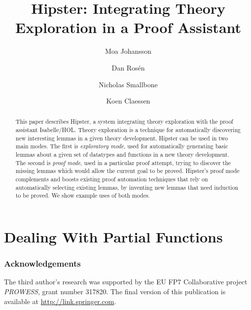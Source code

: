 \documentclass{llncs}
\begin{document}
\title{Hipster: Integrating Theory Exploration in a Proof Assistant}

\author{Moa Johansson \and Dan Ros\'en \and Nicholas Smallbone \and Koen Claessen}


\maketitle

\begin{abstract}

This paper describes Hipster, a system integrating theory exploration with the proof assistant Isabelle/HOL. Theory exploration is a technique for automatically discovering new interesting lemmas in a given theory development.
Hipster can be used in two main modes. The first is {\em exploratory mode}, used for automatically generating basic lemmas about a given set of datatypes and functions in a new theory development. The second is {\em proof mode}, used in a particular proof attempt, trying to discover the missing lemmas which would allow the current goal to be proved. Hipster's proof mode complements and boosts existing proof automation techniques that rely on automatically selecting existing lemmas, by inventing new lemmas that need induction to be proved. We show example uses of both modes.
\end{abstract}








\section{Dealing With Partial Functions}
\label{sec:partial}







\subsubsection*{Acknowledgements} The third author's research was
supported by the EU FP7 Collaborative project {\em PROWESS}, grant
number 317820. The final version of this publication is available at \url{http://link.springer.com}.



\end{document}
